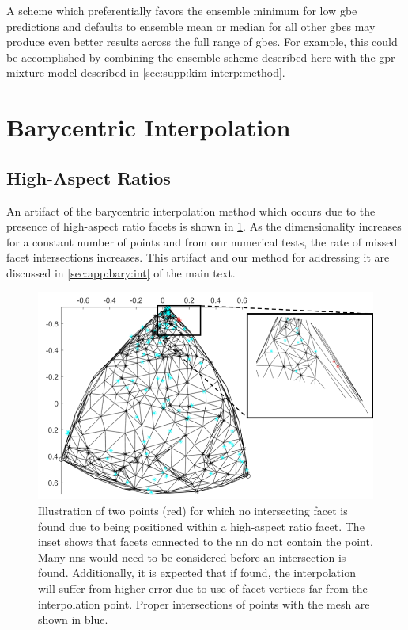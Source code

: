 \documentclass[preprint,12pt]{elsarticle}
\begin{document}
A scheme which preferentially favors the ensemble minimum for low \gls{gbe} predictions and defaults to ensemble mean or median for all other \glspl{gbe} may produce even better results across the full range of \glspl{gbe}. For example, this could be accomplished by combining the ensemble scheme described here with the \gls{gpr} mixture model described in \cref{sec:supp:kim-interp:method}.

\section{Barycentric Interpolation}
\label{sec:supp:bary}

\subsection{High-Aspect Ratios}
\label{sec:supp:bary:artifact}
An artifact of the barycentric interpolation method which occurs due to the presence of high-aspect ratio facets is shown in \cref{fig:high-aspect-non-int}. As the dimensionality increases for a constant number of points and from our numerical tests, the rate of missed facet intersections increases. This artifact and our method for addressing it are discussed in \cref{sec:app:bary:int} of the main text.

\begin{figure}
    \centering
    \includegraphics[scale=1]{figures/high-aspect-non-int.png}
    \caption{Illustration of two \outpt{} points (red) for which no intersecting facet is found due to being positioned within a high-aspect ratio facet. The inset shows that facets connected to the \gls{nn} do not contain the \outpt{} point. Many \glspl{nn} would need to be considered before an intersection is found. Additionally, it is expected that if found, the interpolation will suffer from higher error due to use of facet vertices far from the interpolation point. Proper intersections of \outpt{} points with the mesh are shown in blue.}
    \label{fig:high-aspect-non-int}
\end{figure}
\end{document}
